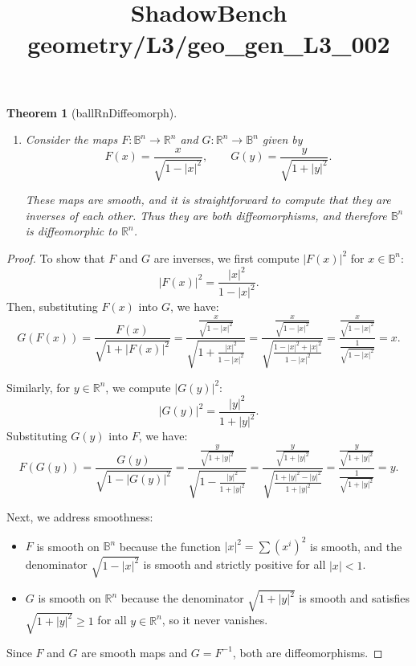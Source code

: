 \documentclass{article}
\title{ShadowBench geometry/L3/geo\_gen\_L3\_002}
\newtheorem{theorem}{Theorem}
\begin{document}
\maketitle

\begin{theorem}[ballRnDiffeomorph]
\begin{enumerate}
    \item[(a)] Consider the maps $F: \mathbb{B}^n \to \mathbb{R}^n$ and $G: \mathbb{R}^n \to \mathbb{B}^n$ given by
    \[
    F(x) = \frac{x}{\sqrt{1 - |x|^2}}, \qquad G(y) = \frac{y}{\sqrt{1 + |y|^2}}.
    \]

    These maps are smooth, and it is straightforward to compute that they are inverses of each other. Thus they are both diffeomorphisms, and therefore $\mathbb{B}^n$ is diffeomorphic to $\mathbb{R}^n$.
\end{enumerate}
\end{theorem}

\begin{proof}
To show that $F$ and $G$ are inverses, we first compute $|F(x)|^2$ for $x \in \mathbb{B}^n$:
\[
|F(x)|^2 = \frac{|x|^2}{1 - |x|^2}.
\]
Then, substituting $F(x)$ into $G$, we have:
\[
G(F(x)) = \frac{F(x)}{\sqrt{1 + |F(x)|^2}} = \frac{\frac{x}{\sqrt{1 - |x|^2}}}{\sqrt{1 + \frac{|x|^2}{1 - |x|^2}}} = \frac{\frac{x}{\sqrt{1 - |x|^2}}}{\sqrt{\frac{1 - |x|^2 + |x|^2}{1 - |x|^2}}} = \frac{\frac{x}{\sqrt{1 - |x|^2}}}{\frac{1}{\sqrt{1 - |x|^2}}} = x.
\]

Similarly, for $y \in \mathbb{R}^n$, we compute $|G(y)|^2$:
\[
|G(y)|^2 = \frac{|y|^2}{1 + |y|^2}.
\]
Substituting $G(y)$ into $F$, we have:
\[
F(G(y)) = \frac{G(y)}{\sqrt{1 - |G(y)|^2}} = \frac{\frac{y}{\sqrt{1 + |y|^2}}}{\sqrt{1 - \frac{|y|^2}{1 + |y|^2}}} = \frac{\frac{y}{\sqrt{1 + |y|^2}}}{\sqrt{\frac{1 + |y|^2 - |y|^2}{1 + |y|^2}}} = \frac{\frac{y}{\sqrt{1 + |y|^2}}}{\frac{1}{\sqrt{1 + |y|^2}}} = y.
\]

Next, we address smoothness:
\begin{itemize}
    \item $F$ is smooth on $\mathbb{B}^n$ because the function $|x|^2 = \sum (x^i)^2$ is smooth, and the denominator $\sqrt{1 - |x|^2}$ is smooth and strictly positive for all $|x| < 1$.
    \item $G$ is smooth on $\mathbb{R}^n$ because the denominator $\sqrt{1 + |y|^2}$ is smooth and satisfies $\sqrt{1 + |y|^2} \ge 1$ for all $y \in \mathbb{R}^n$, so it never vanishes.
\end{itemize}
Since $F$ and $G$ are smooth maps and $G = F^{-1}$, both are diffeomorphisms.
\end{proof}
\end{document}
